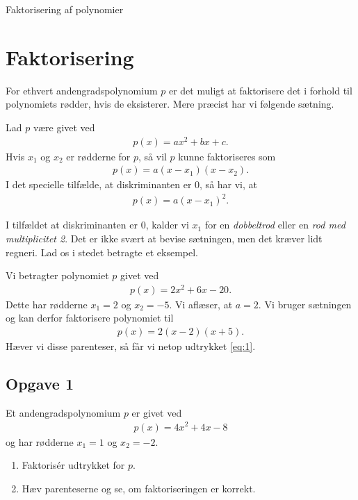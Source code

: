 
\begin{center}
\Huge
Faktorisering af polynomier	
\end{center}
\section*{Faktorisering}

For ethvert andengradspolynomium $p$ er det muligt at faktorisere det i forhold til polynomiets rødder, hvis de eksisterer. Mere præcist har vi følgende sætning.
\begin{setn}[Faktorisering]
	Lad $p$ være givet ved
	\begin{align*}
		p(x) = ax^2 + bx + c.
	\end{align*}
	Hvis $x_1$ og $x_2$ er rødderne for $p$, så vil $p$ kunne faktoriseres som
	\begin{align*}
		p(x) = a(x-x_1)(x-x_2).
	\end{align*}
	I det specielle tilfælde, at diskriminanten er $0$, så har vi, at 
	\begin{align*}
		p(x) = a(x-x_1)^2.
	\end{align*}
\end{setn}
I tilfældet at diskriminanten er $0$, kalder vi $x_1$ for en \textit{dobbeltrod} eller en \textit{rod med multiplicitet 2}. Det er ikke svært at bevise sætningen, men det kræver lidt regneri. Lad os i stedet betragte et eksempel.
\begin{exa}
	Vi betragter polynomiet $p$ givet ved
	\begin{align}\label{eq:1}
		p(x) = 2x^2 + 6x - 20.
	\end{align}
	Dette har rødderne $x_1 = 2$ og $x_2 = -5$. Vi aflæser, at $a = 2$. Vi bruger sætningen og kan derfor 
	faktorisere polynomiet til
	\begin{align*}
		p(x) = 2(x-2)(x+5).
	\end{align*}
	Hæver vi disse parenteser, så får vi netop udtrykket \eqref{eq:1}.
\end{exa}

\subsection*{Opgave 1}
Et andengradspolynomium $p$ er givet ved
\begin{align*}
	p(x) = 4x^2 + 4x - 8
\end{align*}
og har rødderne $x_1 = 1$ og $x_2 = -2$.
\begin{enumerate}[label=\roman*)]
	\item Faktorisér udtrykket for $p$. 
	\item Hæv parenteserne og se, om faktoriseringen er korrekt. 
\end{enumerate}

